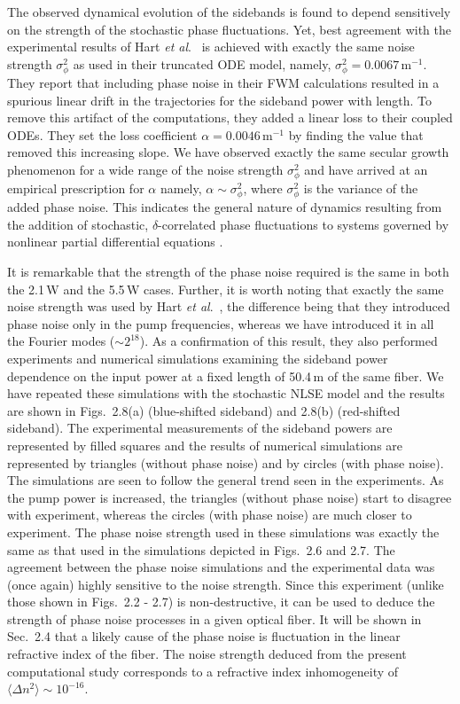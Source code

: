 The observed dynamical evolution of the sidebands is found to depend
sensitively on the strength of the stochastic phase fluctuations. Yet, best
agreement with the experimental results of Hart {\it et al}.\ \cite{hart1} is
achieved with exactly the same noise strength $\sigma^2_\phi$ as used in
their truncated ODE model, namely, $\sigma^2_\phi = 0.0067$\,m$^{-1}$. They
report that including phase noise in their FWM calculations resulted in a
spurious linear drift in the trajectories for the sideband power with length.
To remove this artifact of the computations, they added a linear loss to their
coupled ODEs. They set the loss coefficient $\alpha = 0.0046$\,m$^{-1}$ by
finding the value that removed this increasing slope. We have observed exactly
the same secular growth phenomenon for a wide range of the noise strength
$\sigma^2_\phi$ and have arrived at an empirical prescription for $\alpha$
namely, $\alpha\sim\sigma^2_\phi$, where $\sigma^2_\phi$ is the
variance of the added phase noise. This indicates the general nature of
dynamics resulting from the addition of stochastic, $\delta$-correlated phase
fluctuations to systems governed by nonlinear partial differential equations
\cite{risken}.

It is remarkable that the strength of the phase noise required is the same in
both the 2.1\,W and the 5.5\,W cases. Further, it is worth noting that exactly
the same noise strength was used by Hart {\it et al}.\ \cite{hart1}, the difference
being that they introduced phase noise only in the pump frequencies, whereas
we have introduced it in all the Fourier modes ($\sim2^{18}$). As a
confirmation of this result, they also performed experiments and numerical
simulations examining the sideband power dependence on the input power at a
fixed length of 50.4\,m of the same fiber. We have repeated these simulations
with the stochastic NLSE model and the results are shown in Figs.\ 2.8(a)
(blue-shifted sideband) and 2.8(b) (red-shifted sideband). The experimental
measurements of the sideband powers are represented by filled squares and the
results of numerical simulations are represented by triangles (without phase
noise) and by circles (with phase noise). The simulations are seen to follow
the general trend seen in the experiments. As the pump power is increased, the
triangles (without phase noise) start to disagree with experiment, whereas the
circles (with phase noise) are much closer to experiment. The phase noise
strength used in these simulations was exactly the same as that used in the
simulations depicted in Figs.\ 2.6 and 2.7. The agreement between the phase noise
simulations and the experimental data was (once again) highly sensitive to the
noise strength. Since this experiment (unlike those shown in Figs.\ 2.2 - 2.7)
is non-destructive, it can be used to deduce the strength of phase noise
processes in a given optical fiber. It will be shown in Sec.\ 2.4 that a
likely cause of the phase noise is fluctuation in the linear refractive index
of the fiber. The noise strength deduced from the present computational study
corresponds to a refractive index inhomogeneity of
$\langle \Delta n^{2} \rangle \sim 10^{-16}$.

